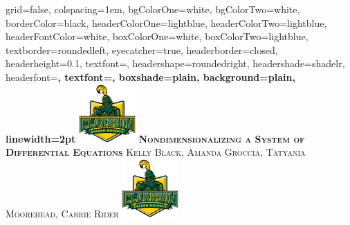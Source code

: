 \documentclass[landscape,final,a0paper,fontscale=0.285]{baposter}
\begin{document}


\begin{poster}%
  {
  grid=false,
  colspacing=1em,
  bgColorOne=white,
  bgColorTwo=white,
  borderColor=black,
  headerColorOne=lightblue,
  headerColorTwo=lightblue,
  headerFontColor=white,
  boxColorOne=white,
  boxColorTwo=lightblue,
  textborder=roundedleft,
  eyecatcher=true,
  headerborder=closed,
  headerheight=0.1\textheight,
  textfont=\sc, %
  headershape=roundedright,
  headershade=shadelr,
  headerfont=\Large\bf\textsc, %
  textfont={\setlength{\parindent}{1.5em}},
  boxshade=plain,
  background=plain,
  linewidth=2pt
  }
  {\includegraphics[height=6em]{img/Clarkson}} 
  {\bf\textsc{Nondimensionalizing a System of Differential Equations}\vspace{0.5em}}
  {\textsc{Kelly Black, Amanda Groccia, Tatyania Moorehead, Carrie Rider}}
  {%
\includegraphics[height=6.0em]{img/Clarkson}
  }


\end{poster}
\end{document}
